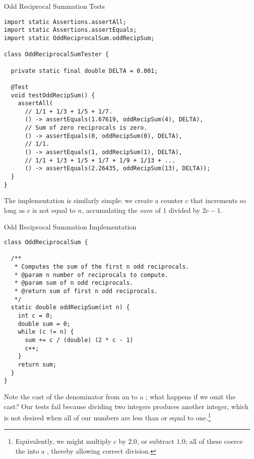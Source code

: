 
\begin{cl}{Odd Reciprocal Summation Tests}
\begin{lstlisting}[language=MyJava]
import static Assertions.assertAll;
import static Assertions.assertEquals;
import static OddReciprocalSum.oddRecipSum;

class OddReciprocalSumTester {

  private static final double DELTA = 0.001;

  @Test
  void testOddRecipSum() {
    assertAll(
      // 1/1 + 1/3 + 1/5 + 1/7.
      () -> assertEquals(1.67619, oddRecipSum(4), DELTA),
      // Sum of zero reciprocals is zero.
      () -> assertEquals(0, oddRecipSum(0), DELTA),
      // 1/1.
      () -> assertEquals(1, oddRecipSum(1), DELTA),
      // 1/1 + 1/3 + 1/5 + 1/7 + 1/9 + 1/13 + ...
      () -> assertEquals(2.26435, oddRecipSum(13), DELTA));
  }
}
\end{lstlisting}
\end{cl}

The implementation is similarly simple: we create a counter $c$ that increments so long as $c$ is not equal to $n$, accumulating the $\textit{sum}$ of $1$ divided by $2c-1$.

\begin{cl}{Odd Reciprocal Summation Implementation}
\begin{lstlisting}[language=MyJava]
class OddReciprocalSum {

  /**
   * Computes the sum of the first n odd reciprocals.
   * @param n number of reciprocals to compute.
   * @param sum of n odd reciprocals.
   * @return sum of first n odd reciprocals.
   */
  static double oddRecipSum(int n) {
    int c = 0;
    double sum = 0;
    while (c != n) {
      sum += c / (double) (2 * c - 1)
      c++;
    }
    return sum;
  }
}
\end{lstlisting}
\end{cl}

Note the cast of the denominator from an  to a ; what happens if we omit the cast? Our tests fail because dividing two integers produces another integer, which is not desired when all of our numbers are less than or equal to one.\footnote{Equivalently, we might multiply $c$ by $2.0$, or subtract $1.0$; all of these coerce the  into a , thereby allowing correct division.}

